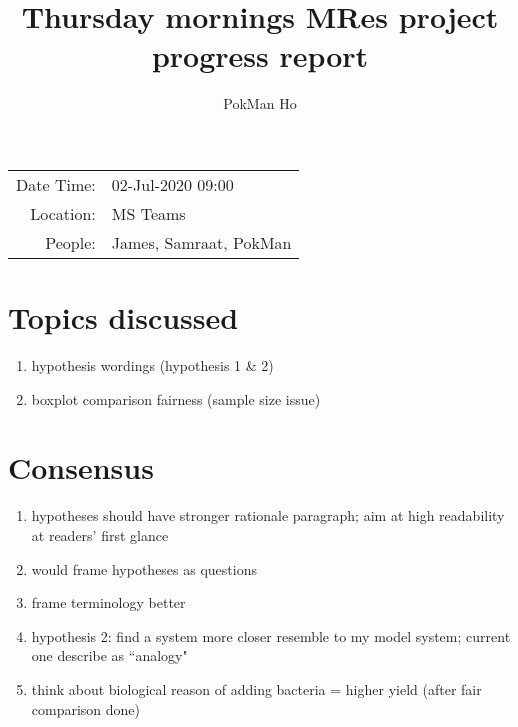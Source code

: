 \documentclass[a4paper,11pt]{article}
\title{Thursday mornings MRes project progress report}
\author{PokMan Ho}
\date{}
\begin{document}
    \maketitle
    
    \begin{tabular}{rl}
        Date Time: & 02-Jul-2020 09:00 \\
        Location: & MS Teams \\
        People: & James, Samraat, PokMan \\
    \end{tabular}
    
    \section{Topics discussed}
    \begin{enumerate}
        \item hypothesis wordings (hypothesis 1 \& 2)
        \item boxplot comparison fairness (sample size issue)
    \end{enumerate}
    
    \section{Consensus}
    \begin{enumerate}
        \item hypotheses should have stronger rationale paragraph; aim at high readability at readers' first glance
        \item would frame hypotheses as questions
        \item frame terminology better
        \item hypothesis 2: find a system more closer resemble to my model system; current one describe as ``analogy"
        \item think about biological reason of adding bacteria = higher yield (after fair comparison done)
    \end{enumerate}
    
\end{document}
